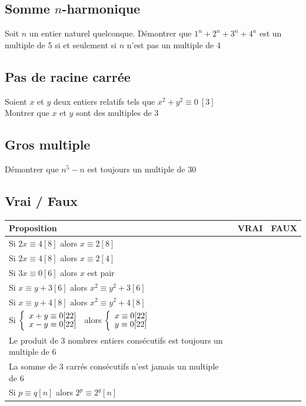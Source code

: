 \documentclass[oneside,12pt]{book}          %
\begin{document}
\subsection{Somme $n$-harmonique}
Soit $n$ un entier naturel quelconque.
Démontrer que $1^n + 2^n + 3^n + 4^n$ est un multiple de 5 si et seulement si $n$ n'est pas un multiple de 4



\subsection{Pas de racine carrée}
Soient $x$ et $y$ deux entiers relatifs tels que $x^2 + y^2 \equiv 0 \ [3]$ \\
Montrer que $x$ et $y$ sont des multiples de 3



\subsection{Gros multiple}
Démontrer que $n^5-n$ est toujours un multiple de 30



\subsection{Vrai / Faux}
\begin{center}
\renewcommand{\arraystretch}{1.7}
\begin{tabular}{|p{}|p{1.5cm}|p{1.5cm}|} \hline
    \centering Proposition & VRAI & FAUX \\ \hline
    \centering Si $2x\equiv4 [8]$ alors $x\equiv2 [8]$ & & \\ \hline
    \centering Si $2x\equiv4 [8]$ alors $x\equiv2 [4]$ & & \\ \hline
    \centering Si $3x\equiv0 [6]$ alors $x$ est pair & & \\ \hline
    \centering Si $x\equiv y+3 [6]$ alors $x^2\equiv y^2+3 [6]$ & & \\ \hline
    \centering Si $x\equiv y+4 [8]$ alors $x^2\equiv y^2+4 [8]$ & & \\ \hline
    \centering Si $\accol{x+y\equiv 0 [22] \\ x-y\equiv 0 [22]}$ alors $\accol{x\equiv0[22] \\ y\equiv0 [22]}$ & & \\ \hline
    \centering Le produit de 3 nombres entiers consécutifs est toujours un multiple de 6 & & \\ \hline
    \centering La somme de 3 carrés consécutifs n'est jamais un multiple de 6 & & \\ \hline
    \centering Si $p\equiv q[n]$ alors $2^p\equiv 2^q[n]$ & & \\ \hline
\end{tabular}
\end{center}
\end{document}
